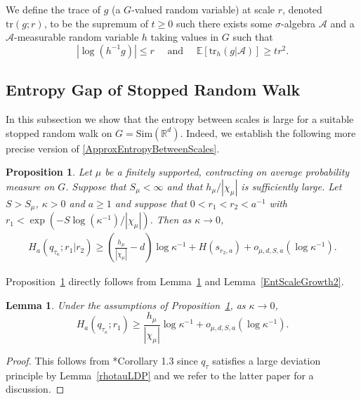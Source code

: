 \documentclass[10pt, english,oneside,reqno]{amsart}
\theoremstyle{plain}
\newtheorem{proposition}[theorem]{Proposition}
\newtheorem{lemma}[theorem]{Lemma}
\theoremstyle{remark}
\numberwithin{equation}{section}
\numberwithin{figure}{section}
\newcommand{\tr}{\mathrm{tr}}
\newcommand{\R}{\mathbb{R}}
\newcommand{\E}{\mathbb{E}}
\newcommand{\RWEntropy}{h_{\mu}}
\begin{document}
We define the trace of $g$ (a $G$-valued random variable) at scale $r$, denoted $\tr(g; r)$,  to be the supremum of $t\geq 0$ such there exists some $\sigma$-algebra $\mathscr{A}$ and a $\mathscr{A}$-measurable random variable $h$ taking values in $G$ such that $$|\log(h^{-1}g)| \leq r \quad \text{ and } \quad \E[\tr_h(g|\mathscr{A})] \geq tr^2.$$ 




\subsection{Entropy Gap of Stopped Random Walk}

In this subsection we show that the entropy between scales is large for a suitable stopped random walk on $G = \mathrm{Sim}(\R^d)$. Indeed, we establish the following more precise version of \eqref{ApproxEntropyBetweenScales}.

\begin{proposition}\label{EntropyBetweenScalesIncrease}
    Let $\mu$ be a finitely supported, contracting on average probability measure on $G$.  Suppose that $S_{\mu} < \infty$ and  that $h_{\mu}/|\chi_{\mu}|$ is sufficiently large. Let $S > S_{\mu}$, $\kappa > 0$ and $a \geq 1$ and suppose that $0 < r_1 < r_2 < a^{-1}$ with $r_1 < \exp( -S \log(\kappa^{-1})/|\chi_{\mu}|)$. Then as $\kappa \to 0$,
    \begin{align*}
          H_a(q_{\tau_{\kappa}}; r_1|r_2) \geq \left( \frac{\RWEntropy}{|\chi_{\mu}|} - d  \right) \log \kappa^{-1} + H(s_{r_2,a}) + o_{\mu,d,S,a}(\log \kappa^{-1}).
    \end{align*}
\end{proposition}

Proposition~\ref{EntropyBetweenScalesIncrease} directly follows from Lemma~\ref{EntScaleGrowth1} and Lemma~\ref{EntScaleGrowth2}. 
 
\begin{lemma}\label{EntScaleGrowth1}
    Under the assumptions of Proposition~\ref{EntropyBetweenScalesIncrease}, as $\kappa \to 0$, $$H_a(q_{\tau_{\kappa}}; r_1) \geq \frac{h_{\mu}}{|\chi_{\mu}|} \log \kappa^{-1} + o_{\mu,d,S,a}(\log \kappa^{-1}).$$
\end{lemma}

\begin{proof}
    This follows from \cite{KittleKoglerEntropy}*{Corollary 1.3} since $q_{\tau}$ satisfies a large deviation principle by Lemma~\ref{rhotauLDP} and we refer to the latter paper for a discussion.
\end{proof}
\end{document}
